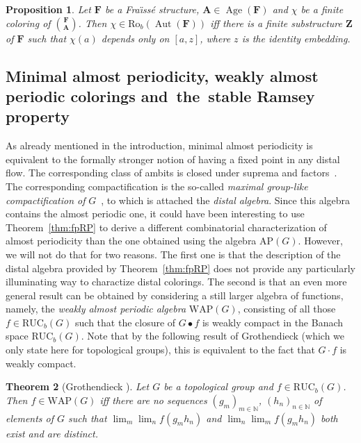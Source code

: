 \documentclass[11pt]{article}
\newtheorem{theo}{Theorem}[section]
\newtheorem{prop}[theo]{Proposition}
\theoremstyle{definition}
\numberwithin{equation}{section}
\numberwithin{figure}{section}
\numberwithin{table}{section}
\newcommand{\N}{\mathbb{N}}
\newcommand*{\mA}{\mathbf{A}}
\newcommand*{\mF}{\mathbf{F}}
\newcommand*{\mZ}{\mathbf{Z}}
\DeclareMathOperator{\Aut}{Aut}
\DeclareMathOperator{\Age}{Age}
\newcommand{\RUCB}{\mathrm{RUC}_{b}}
\newcommand{\ROB}{\mathrm{Ro}_{b}}
\newcommand{\WAP}{\mathrm{WAP}}
\begin{document}
\begin{prop}\label{prop:Roelcke coloring}
Let $\mF$ be a Fra\"{\i}ss\'e structure, $\mA\in \Age(\mF)$ and $\chi$ be a finite coloring of $\binom{\mF}{\mA}$. Then $\chi\in \ROB(\Aut(\mF))$ iff there is a finite substructure $\mZ$ of $\mF$ such that $\chi(a)$ depends only on $[a,z]$, where $z$ is the identity embedding.
\end{prop}

\subsection{Minimal almost periodicity, weakly almost periodic colorings and~the~stable Ramsey property}
\label{subsection:WAP}

As already mentioned in the introduction, minimal almost periodicity is equivalent to the formally stronger notion of having a fixed point in any distal flow. The corresponding class of ambits is closed under suprema and factors~\cite[Chapter~IV, Section~2.27]{dV}. The corresponding compactification is the so-called \emph{maximal group-like compactification of} $G$~\cite[Chapter~IV, Section~6.18]{dV}, to which is attached the \emph{distal algebra}. Since this algebra contains the almost periodic one, it could have been interesting to use Theorem~\ref{thm:fpRP} to derive a different combinatorial characterization of almost periodicity than the one obtained using the algebra $\mathrm{AP}(G)$. However, we will not do that for two reasons. The first one is that the description of the distal algebra provided by Theorem~\ref{thm:fpRP} does not provide any particularly illuminating way to charactize distal colorings. The second is that an even more general result can be obtained by considering a still larger algebra of functions, namely, the \emph{weakly almost periodic algebra} $\WAP(G)$, consisting of all those $f\in \RUCB(G)$ such that the closure of $G\bullet f$ is weakly compact in the Banach space $\RUCB(G)$. Note that by the following result of Grothendieck (which we only state here for topological groups), this is equivalent to the fact that $G\cdot f$ is weakly compact.

\begin{theo}[{Grothendieck \cite[Proposition~7]{Grothendieck}}]
\label{thm:Gro}
Let $G$ be a topological group and $f\in \RUCB(G)$. Then $f\in \WAP(G)$ iff there are no sequences $(g_{m})_{m\in \N}$, $(h_{n})_{n\in \N}$ of elements of $G$ such that $\displaystyle \lim_{m}\lim_{n}f(g_{m}h_{n})$ and $\displaystyle \lim_{n}\lim_{m}f(g_{m}h_{n})$ both exist and are distinct.
\end{theo}
\end{document}
